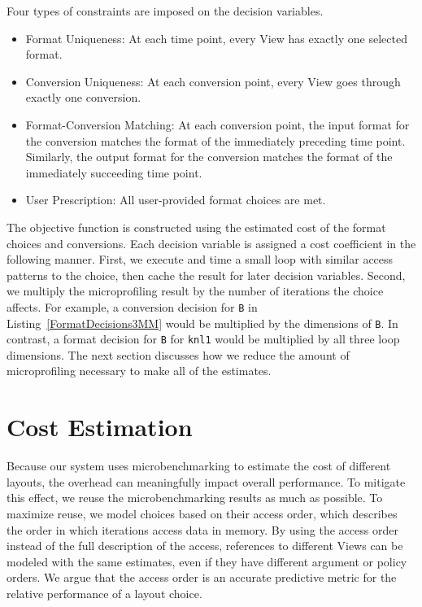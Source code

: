 \documentclass[sigconf, table]{acmart}
\begin{document}
Four types of constraints are imposed on the decision variables.
\begin{itemize}
\item Format Uniqueness: At each time point, every View has exactly one selected format. 
\item Conversion Uniqueness: At each conversion point, every View goes through exactly one conversion.
\item Format-Conversion Matching: At each conversion point, the input format for the conversion matches the format of the immediately preceding time point. Similarly, the output format for the conversion matches the format of the immediately succeeding time point.
\item User Prescription: All user-provided format choices are met.
\end{itemize}

The objective function is constructed using the estimated cost of the format choices and conversions. 
Each decision variable is assigned a cost coefficient in the following manner.
First, we execute and time a small loop with similar access patterns to the choice, then cache the result for later decision variables.
Second, we multiply the microprofiling result by the number of iterations the choice affects.
For example, a conversion decision for \verb.B. in Listing~\ref{FormatDecisions3MM} would be multiplied by the dimensions of \verb.B..
In contrast, a format decision for \verb.B. for \verb.knl1. would be multiplied by all three loop dimensions. 
The next section discusses how we reduce the amount of microprofiling necessary to make all of the estimates.

\section{Cost Estimation}

Because our system uses microbenchmarking to estimate the cost of different layouts, the overhead can meaningfully impact overall performance. 
To mitigate this effect, we reuse the microbenchmarking results as much as possible. 
To maximize reuse, we model choices based on their access order, which describes the order in which iterations access data in memory.
By using the access order instead of the full description of the access, references to different Views can be modeled with the same estimates, even if they have different argument or policy orders.
We argue that the access order is an accurate predictive metric for the relative performance of a layout choice. 
\end{document}
